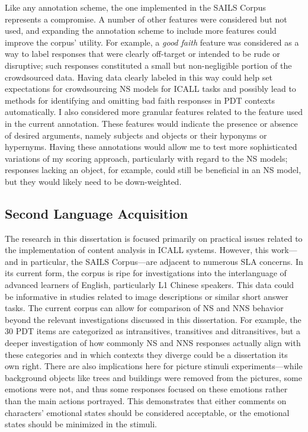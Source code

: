 Like any annotation scheme, the one implemented in the SAILS Corpus represents a compromise. A number of other features were considered but not used, and expanding the annotation scheme to include more features could improve the corpus' utility. For example, a \textit{good faith} feature was considered as a way to label responses that were clearly off-target or intended to be rude or disruptive; such responses constituted a small but non-negligible portion of the crowdsourced data. Having data clearly labeled in this way could help set expectations for crowdsourcing NS models for ICALL tasks and possibly lead to methods for identifying and omitting bad faith responses in PDT contexts automatically. I also considered more granular features related to the  feature used in the current annotation. These features would indicate the presence or absence of desired arguments, namely subjects and objects or their hyponyms or hypernyms. Having these annotations would allow me to test more sophisticated variations of my scoring approach, particularly with regard to the NS models; responses lacking an object, for example, could still be beneficial in an NS model, but they would likely need to be down-weighted.

\subsection{Second Language Acquisition}
\label{sec:outlook-sla}

The research in this dissertation is focused primarily on practical issues related to the implementation of content analysis in ICALL systems. However, this work---and in particular, the SAILS Corpus---are adjacent to numerous SLA concerns. In its current form, the corpus is ripe for investigations into the interlanguage of advanced learners of English, particularly L1 Chinese speakers. This data could be informative in studies related to image descriptions or similar short answer tasks. The current corpus can allow for comparison of NS and NNS behavior beyond the relevant investigations discussed in this dissertation. For example, the 30 PDT items are categorized as intransitives, transitives and ditransitives, but a deeper investigation of how commonly NS and NNS responses actually align with these categories and in which contexts they diverge could be a dissertation its own right. There are also implications here for picture stimuli experiments---while background objects like trees and buildings were removed from the pictures, some emotions were not, and thus some responses focused on these emotions rather than the main actions portrayed. This demonstrates that either comments on characters' emotional states should be considered acceptable, or the emotional states should be minimized in the stimuli.

